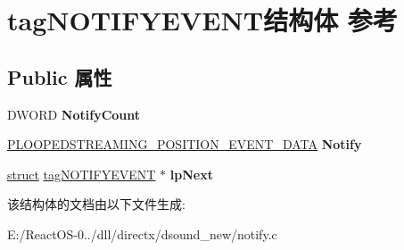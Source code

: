 \hypertarget{structtag_n_o_t_i_f_y_e_v_e_n_t}{}\section{tag\+N\+O\+T\+I\+F\+Y\+E\+V\+E\+N\+T结构体 参考}
\label{structtag_n_o_t_i_f_y_e_v_e_n_t}
\subsection*{Public 属性}
\begin{DoxyCompactItemize}
\item 
\mbox{\label{structtag_n_o_t_i_f_y_e_v_e_n_t_a992b323deaca899ddeb7c7029f20ab12}} 
D\+W\+O\+RD {\bfseries Notify\+Count}
\item 
\mbox{\label{structtag_n_o_t_i_f_y_e_v_e_n_t_a1c6b29eafb7b73ee99faf456ec73f600}} 
\hyperlink{struct_l_o_o_p_e_d_s_t_r_e_a_m_i_n_g___p_o_s_i_t_i_o_n___e_v_e_n_t___d_a_t_a}{P\+L\+O\+O\+P\+E\+D\+S\+T\+R\+E\+A\+M\+I\+N\+G\+\_\+\+P\+O\+S\+I\+T\+I\+O\+N\+\_\+\+E\+V\+E\+N\+T\+\_\+\+D\+A\+TA} {\bfseries Notify}
\item 
\mbox{\label{structtag_n_o_t_i_f_y_e_v_e_n_t_aaf44b695c96d2ff38453c8fd80cde598}} 
\hyperlink{interfacestruct}{struct} \hyperlink{structtag_n_o_t_i_f_y_e_v_e_n_t}{tag\+N\+O\+T\+I\+F\+Y\+E\+V\+E\+NT} $\ast$ {\bfseries lp\+Next}
\end{DoxyCompactItemize}


该结构体的文档由以下文件生成\+:\begin{DoxyCompactItemize}
\item 
E\+:/\+React\+O\+S-\/0../dll/directx/dsound\+\_\+new/notify.\+c\end{DoxyCompactItemize}
